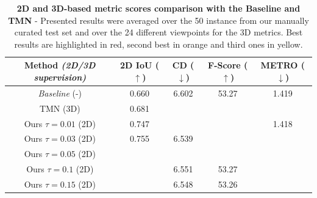 \begin{table}[htp!]
    \caption{\textbf{2D and 3D-based metric scores comparison with the Baseline and TMN} \citep{pan2019deep} - Presented results were averaged over the 50 instance from our manually curated test set and over the 24 different viewpoints for the 3D metrics. Best results are highlighted in \colorbox{red!25}{red}, second best in \colorbox{orange!25}{orange} and third ones in \colorbox{yellow!25}{yellow}.}
    \label{tab:sota_table}
    \begin{center}
    \centering
    \begin{adjustbox}{width=\textwidth}
    \begin{tabular}[h]{c||cccc}
    \hline
    Method \textit{(2D/3D supervision)} &  2D IoU ($\uparrow$) & CD ($\downarrow$) & F-Score ($\uparrow$) & METRO ($\downarrow$) \\[.5pt]
    \hline
    \textit{Baseline} (-)& 0.660  &  6.602  & 53.27  &  1.419  \\[1.5pt]
    TMN \citep{pan2019deep} (3D)  & 0.681  & \cellcolor{red!25}{6.328}   & \cellcolor{red!25}{54.23}  & \cellcolor{red!25}{1.293} \\
    \hline 
    Ours $\scriptstyle \tau=0.01$ (2D) & 0.747 &\cellcolor{yellow!25}{6.541}  &  \cellcolor{orange!25}{53.39} &  1.418      \\
    Ours $\scriptstyle \tau=0.03$ (2D) & 0.755 &6.539  & \cellcolor{orange!25}{53.39}  &    \cellcolor{yellow!25}{1.417}  \\
    Ours $\scriptstyle \tau=0.05$ (2D) & \cellcolor{yellow!25}{0.763} & \cellcolor{orange!25}{6.540}  &  \cellcolor{yellow!25}{53.34} &   \cellcolor{yellow!25}{1.417}     \\
    Ours $\scriptstyle \tau=0.1$ (2D)& \cellcolor{red!25}{0.778} & 6.551  & 53.27 &  \cellcolor{orange!25}{1.416}     \\
    Ours $\scriptstyle \tau=0.15$ (2D)& \cellcolor{orange!25}{0.771} & 6.548  & 53.26  &    \cellcolor{orange!25}{1.416}   \\
    \hline 
    \end{tabular}
    \end{adjustbox}
    \end{center}
    
    \end{table}

